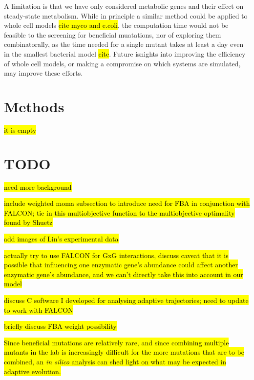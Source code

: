 A limitation is that we have only considered metabolic genes and their
effect on steady-state metabolism. While in principle a similar method
could be applied to whole cell models \hl{cite myco and e.coli}, the
computation time would not be feasible to the screening for beneficial
muatations, nor of exploring them combinatorally, as the time needed
for a single mutant takes at least a day even in the smallest
bacterial model \hl{cite}. Future isnights into improving the
efficiency of whole cell models, or making a compromise on which
systems are simulated, may improve these efforts.

\section{Methods}
\hl{it is empty}

\section{TODO}

\hl{need more background}


\hl{include weighted moma subsection to introduce need for FBA
in conjunction with FALCON; tie in this multiobjective function
to the multiobjective optimality found by Shuetz}

\hl{add images of Lin's experimental data}

\hl{actually try to use FALCON for GxG interactions, discuss caveat
that it is possible that influencing one enzymatic gene's abundance
could affect another enzymatic gene's abundance, and we can't directly
take this into account in our model}

\hl{discuss C software I developed for analysing adaptive trajectories;
need to update to work with FALCON}


\hl{briefly discuss FBA weight possibility}


\hl{Since beneficial mutations are relatively rare, and since
combining multiple mutants in the lab is increasingly difficult for
the more mutations that are to be combined, an \textit{in silico}
analysis can shed light on what may be expected in adaptive
evolution.}

